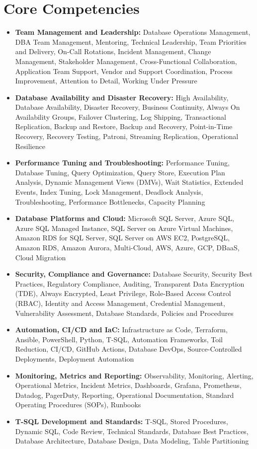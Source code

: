 \documentclass[10pt,a4paper]{article}
\begin{document}
\section{Core Competencies}
\begin{itemize}
  \item \textbf{Team Management and Leadership:} Database Operations Management, DBA Team Management, Mentoring, Technical Leadership, Team Priorities and Delivery, On-Call Rotations, Incident Management, Change Management, Stakeholder Management, Cross-Functional Collaboration, Application Team Support, Vendor and Support Coordination, Process Improvement, Attention to Detail, Working Under Pressure
  \item \textbf{Database Availability and Disaster Recovery:} High Availability, Database Availability, Disaster Recovery, Business Continuity, Always On Availability Groups, Failover Clustering, Log Shipping, Transactional Replication, Backup and Restore, Backup and Recovery, Point-in-Time Recovery, Recovery Testing, Patroni, Streaming Replication, Operational Resilience
  \item \textbf{Performance Tuning and Troubleshooting:} Performance Tuning, Database Tuning, Query Optimization, Query Store, Execution Plan Analysis, Dynamic Management Views (DMVs), Wait Statistics, Extended Events, Index Tuning, Lock Management, Deadlock Analysis, Troubleshooting, Performance Bottlenecks, Capacity Planning
  \item \textbf{Database Platforms and Cloud:} Microsoft SQL Server, Azure SQL, Azure SQL Managed Instance, SQL Server on Azure Virtual Machines, Amazon RDS for SQL Server, SQL Server on AWS EC2, PostgreSQL, Amazon RDS, Amazon Aurora, Multi-Cloud, AWS, Azure, GCP, DBaaS, Cloud Migration
  \item \textbf{Security, Compliance and Governance:} Database Security, Security Best Practices, Regulatory Compliance, Auditing, Transparent Data Encryption (TDE), Always Encrypted, Least Privilege, Role-Based Access Control (RBAC), Identity and Access Management, Credential Management, Vulnerability Assessment, Database Standards, Policies and Procedures
  \item \textbf{Automation, CI/CD and IaC:} Infrastructure as Code, Terraform, Ansible, PowerShell, Python, T-SQL, Automation Frameworks, Toil Reduction, CI/CD, GitHub Actions, Database DevOps, Source-Controlled Deployments, Deployment Automation
  \item \textbf{Monitoring, Metrics and Reporting:} Observability, Monitoring, Alerting, Operational Metrics, Incident Metrics, Dashboards, Grafana, Prometheus, Datadog, PagerDuty, Reporting, Operational Documentation, Standard Operating Procedures (SOPs), Runbooks
  \item \textbf{T-SQL Development and Standards:} T-SQL, Stored Procedures, Dynamic SQL, Code Review, Technical Standards, Database Best Practices, Database Architecture, Database Design, Data Modeling, Table Partitioning
\end{itemize}
\end{document}

